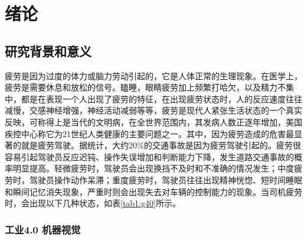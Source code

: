 \chapter{绪论}
\label{chap1}
\section{研究背景和意义}


疲劳是因为过度的体力或脑力劳动引起的，它是人体正常的生理现象。在医学上，疲劳是需要休息和放松的信号\cite{dc2014}。瞌睡，眼睛疲劳加上频繁打哈欠，以及精力不集中，都是在表现一个人出现了疲劳的特征，在出现疲劳状态时，人的反应速度往往减慢，交感神经增强，神经活动减弱等等，疲劳是现代人紧张生活状态的一个真实反映，可称得上是当代的文明病，在全世界范围内，其发病人数正逐年增加，美国疾控中心称它为21世纪人类健康的主要问题之一。其中，因为疲劳造成的危害最显著的就是疲劳驾驶。据统计，大约20\%的交通事故是因为疲劳驾驶引起的。疲劳很容易引起驾驶员反应迟钝、操作失误增加和判断能力下降，发生道路交通事故的概率明显提高。轻微疲劳时，驾驶员会出现换挡不及时和不准确的情况发生；中度疲劳时，驾驶员操作动作呆滞；重度疲劳时，驾驶员往往出现精神恍惚、短时间睡眠和瞬间记忆消失现象，严重时则会出现失去对车辆的控制能力的现象。当司机疲劳时，会出现以下几种状态\cite{qhf2017peopledialy}，如表\ref{tab1:g40}所示。 



\subsection{工业4.0 机器视觉}   

